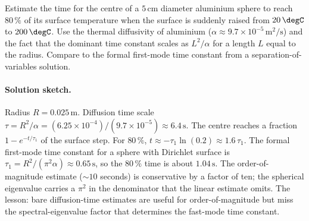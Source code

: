 \begin{exercise}
Estimate the time for the centre of a $5\,\si{\centi\meter}$
diameter aluminium sphere to reach $80\,\%$ of its surface
temperature when the surface is suddenly raised from $20\,\degC$
to $200\,\degC$. Use the thermal diffusivity of aluminium
($\alpha \approx 9.7 \times 10^{-5}\,\si{\meter\squared\per
\second}$) and the fact that the dominant time constant scales as
$L^{2}/\alpha$ for a length $L$ equal to the radius. Compare to
the formal first-mode time constant from a separation-of-variables
solution.

\paragraph{Solution sketch.}
Radius $R = 0.025\,\si{\meter}$. Diffusion time scale $\tau =
R^{2}/\alpha = (6.25 \times 10^{-4})/(9.7 \times 10^{-5}) \approx
6.4\,\si{\second}$. The centre reaches a fraction $1 - e^{-t/
\tau_{1}}$ of the surface step. For $80\,\%$, $t \approx -\tau_{1}
\ln(0.2) \approx 1.6\, \tau_{1}$. The formal first-mode time
constant for a sphere with Dirichlet surface is $\tau_{1} =
R^{2}/(\pi^{2} \alpha) \approx 0.65\,\si{\second}$, so the
$80\,\%$ time is about $1.04\,\si{\second}$. The order-of-magnitude
estimate ($\sim 10$ seconds) is conservative by a factor of ten;
the spherical eigenvalue carries a $\pi^{2}$ in the denominator
that the linear estimate omits. The lesson: bare diffusion-time
estimates are useful for order-of-magnitude but miss the
spectral-eigenvalue factor that determines the fast-mode time
constant.
\end{exercise}

